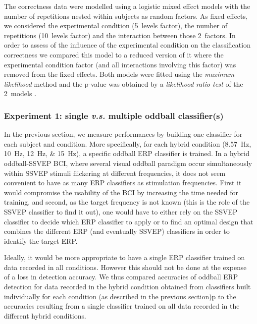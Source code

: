 \documentclass[10pt]{article}
\begin{document}
        The correctness data were modelled using a logistic mixed effect models \parencite{Jaeger2008a} with the number of repetitions nested within subjects as random factors.
        As fixed effects, we considered the experimental condition (5~levels factor), the number of repetitions (10~levels factor) and the interaction between those 2~factors.
        In order to assess of the influence of the experimental condition on the classification correctness we compared this model to a reduced version of it where the experimental condition factor (and all interactions involving this factor) was removed from the fixed effects.
        Both models were fitted using the \emph{maximum likelihood} method and the p-value was obtained by a \emph{likelihood ratio test} of the 2~models \parencite{Pinheiro2000}.

        \subsubsection{Experiment 1: single \emph{v.s.} multiple oddball classifier(s)}
        \label{sec:2.3.1AnalysisExp1ter}
        In the previous section, we measure performances by building one classifier for each subject and condition.
        More specifically, for each hybrid condition (\SIlist[list-units = single]{8.57;10;12;15}{\Hz}), a specific oddball ERP classifier is trained.
        In a hybrid oddball-SSVEP BCI, where several visual oddball paradigm occur simultaneously within SSVEP stimuli flickering at different frequencies, it does not seem convenient to have as many ERP classifiers as stimulation frequencies.
        First it would compromise the usability of the BCI by increasing the time needed for training, and second, as the target frequency is not known (this is the role of the SSVEP classifier to find it out), one would have to either rely on the SSVEP classifier to decide which ERP classifier to apply or to find an optimal design that combines the different ERP (and eventually SSVEP) classifiers in order to identify the target ERP.

        Ideally, it would be more appropriate to have a single ERP classifier trained on data recorded in all conditions.
        However this should not be done at the expense of a loss in detection accuracy.
        We thus compared accuracies of oddball ERP detection for data recorded in the hybrid condition obtained from classifiers built individually for each condition (as described in the previous section)p to the accuracies resulting from a single classifier trained on all data recorded in the different hybrid conditions.
\end{document}
